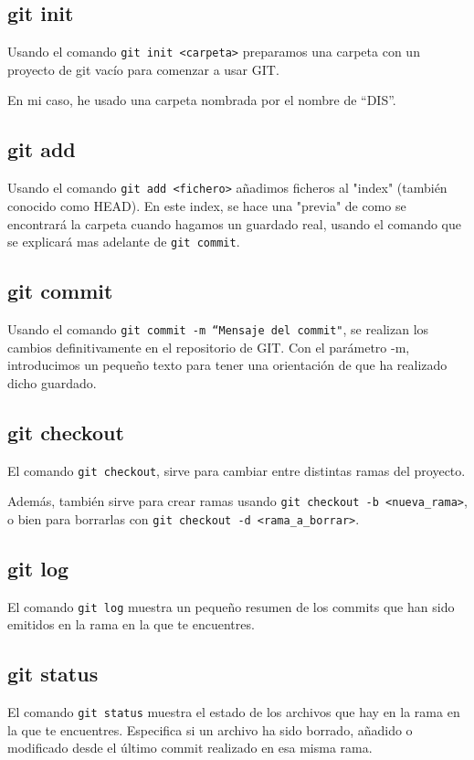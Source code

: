 \documentclass[a4,12pt]{article}
\begin{document}
\subsection{git init}
Usando el comando \texttt{git init <carpeta>} preparamos una carpeta con un proyecto de git vacío para comenzar a usar GIT.

\bigskip
En mi caso, he usado una carpeta nombrada por el nombre de ``DIS''.

\subsection{git add}
Usando el comando \texttt{git add <fichero>} añadimos ficheros al "index" (también conocido como HEAD). En este index, se hace una "previa" de como se encontrará la carpeta cuando hagamos un guardado real, usando el comando que se explicará mas adelante de \texttt{git commit}.

\subsection{git commit}
Usando el comando \texttt{git commit -m ``Mensaje del commit"}, se realizan los cambios definitivamente en el repositorio de GIT. Con el parámetro -m, introducimos un pequeño texto para tener una orientación de que ha realizado dicho guardado.

\subsection{git checkout}
El comando \texttt{git checkout}, sirve para cambiar entre distintas ramas del proyecto.

\bigskip
Además, también sirve para crear ramas usando \texttt{git checkout -b <nueva\_rama>}, o bien para borrarlas con \texttt{git checkout -d <rama\_a\_borrar>}.

\subsection{git log}
El comando \texttt{git log} muestra un pequeño resumen de los commits que han sido emitidos en la rama en la que te encuentres.

\subsection{git status}
El comando \texttt{git status} muestra el estado de los archivos que hay en la rama en la que te encuentres. Especifica si un archivo ha sido borrado, añadido o modificado desde el último commit realizado en esa misma rama.
\end{document}
